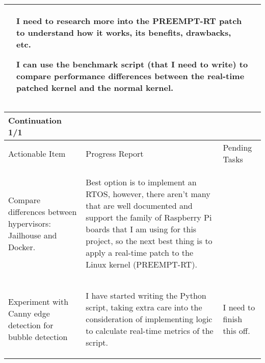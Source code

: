 \begin{table}[!h]
\begin{tabularx}{\textwidth}{|X|X|X|}
\begin{myitemize}
        \end{myitemize} &
        \begin{myitemize}
            \item I need to research more into the PREEMPT-RT patch to understand how it works, its benefits, drawbacks, etc.
            \item I can use the benchmark script (that I need to write) to compare performance differences between the real-time patched kernel and the normal kernel.
        \end{myitemize} \\
        \hline
    \end{tabularx}
\end{table}

\pagebreak

\begin{table}[!h]
    \centering
    \begin{tabularx}{\textwidth}{|X|X|X|}
        \hline
        Continuation 1/1 \\
        \hline
        \hline
        Actionable Item & Progress Report & Pending Tasks \\
        \hline
        \hline
        Compare differences between hypervisors: Jailhouse and Docker. & 
        \begin{myitemize}
            \item Best option is to implement an RTOS, however, there aren't many that are well documented and support the family of Raspberry Pi boards that I am using for this project, so the next best thing is to apply a real-time patch to the Linux kernel (PREEMPT-RT).
        \end{myitemize} &
        \\
        \hline
        Experiment with Canny edge detection for bubble detection & 
        \begin{myitemize}
            \item I have started writing the Python script, taking extra care into the consideration of implementing logic to calculate real-time metrics of the script.
        \end{myitemize} &
        \begin{myitemize}
            \item I need to finish this off.
        \end{myitemize} \\
        \hline
    \end{tabularx}
\end{table}

